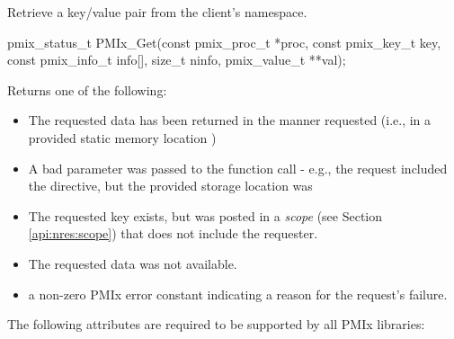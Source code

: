 \summary

Retrieve a key/value pair from the client's namespace.

\format

\cspecificstart
\begin{codepar}
pmix_status_t
PMIx_Get(const pmix_proc_t *proc, const pmix_key_t key,
         const pmix_info_t info[], size_t ninfo,
         pmix_value_t **val);
\end{codepar}
\cspecificend

\begin{arglist}
\end{arglist}

Returns one of the following:

\begin{itemize}
\item {} The requested data has been returned in the manner requested (i.e., in a provided static memory location )
\item {} A bad parameter was passed to the function call - e.g., the request included the  directive, but the provided storage location was 
\item {} The requested key exists, but was posted in a \emph{scope} (see Section \ref{api:nres:scope}) that does not include the requester.
\item {} The requested data was not available.
\item a non-zero \ac{PMIx} error constant indicating a reason for the request's failure.
\end{itemize}

\reqattrstart
The following attributes are required to be supported by all \ac{PMIx} libraries:


